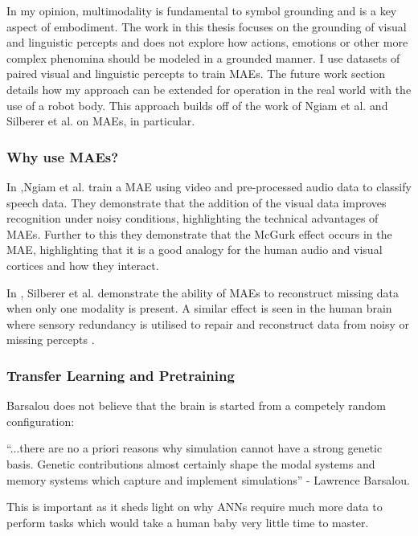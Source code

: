 In my opinion, multimodality is fundamental to symbol grounding and is a key aspect of embodiment. The work in this thesis focuses on the grounding of visual and linguistic percepts and does not explore how actions, emotions or other more complex phenomina should be modeled in a grounded manner. I use datasets of paired visual and linguistic percepts to train \acp{MAE}. The future work section details how my approach can be extended for operation in the real world with the use of a robot body. This approach builds off of the work of Ngiam et al. \cite{ngiam2011multimodal} and Silberer et al.\cite{silberer2014learning} on \acp{MAE}, in particular.

\subsubsection{Why use MAEs?}
In \cite{ngiam2011multimodal},Ngiam et al. train a \ac{MAE} using video and pre-processed audio data to classify speech data. They demonstrate that the addition of the visual data improves recognition under noisy conditions, highlighting the technical advantages of \acp{MAE}. Further to this they demonstrate that the McGurk effect \cite{mcgurk1976hearing} occurs in the \ac{MAE}, highlighting that it is a good analogy for the human audio and visual cortices and how they interact.

In \cite{silberer2014learning}, Silberer et al. demonstrate the ability of \acp{MAE} to reconstruct missing data when only one modality is present. A similar effect is seen in the human brain where sensory redundancy is utilised to repair and reconstruct data from noisy or missing percepts \cite{samuel1997lexical}. 

\subsubsection{Transfer Learning and Pretraining}

Barsalou \cite{barsalou2008grounded} does not believe that the brain is started from a competely random configuration:
\begin{displayquote}
``...there are no a priori reasons why simulation cannot have a strong genetic basis. Genetic contributions almost certainly shape the modal systems and memory systems which capture and implement simulations'' - Lawrence Barsalou.
\end{displayquote}

This is important as it sheds light on why \acp{ANN} require much more data to perform tasks which would take a human baby very little time to master. 

